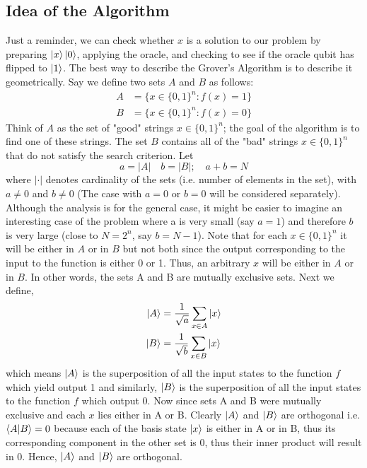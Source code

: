 \subsection{Idea of the Algorithm}
Just a reminder, we can check whether $x$ is a solution to our problem by preparing $\ket{x}\ket{0}$, applying the oracle, and checking to see if the oracle qubit has flipped to $\ket{1}$. The best way to describe the Grover's Algorithm is to describe it geometrically. Say we define two sets $A$ and $B$ as follows:
\begin{align*}
A&=\{x\in\{0,1\}^n: f(x)=1\}\\
B&=\{x\in\{0,1\}^n: f(x)=0\}
\end{align*}
Think of $A$ as the set of "good" strings $x \in \{0,1\}^n$; the goal of the algorithm is to find one of these strings. The set $B$ contains all of the "bad" strings $x\in\{0,1\}^n$ that do not satisfy the search criterion. Let
\[
a=|A| \quad b=|B|; \quad a+b=N
\]
where $|\cdot|$ denotes cardinality of the sets (i.e. number of elements in the set), with $a\neq 0$ and $b\neq 0$ (The case with $a=0$ or $b=0$ will be considered separately). Although the analysis is for the general case, it might be easier to imagine an interesting case of the problem where a is very small (say $a=1$) and therefore $b$ is very large (close to $N=2^n$, say $b=N-1$). Note that for each $x \in \{0,1\}^n$ it will be either in $A$ or in $B$ but not both since the output corresponding to the input to the function is either 0 or 1. Thus, an arbitrary $x$ will be either in $A$ or in $B$. In other words, the sets A and B are mutually exclusive sets.
Next we define, 
\begin{align*}
    \ket{A}&=\frac{1}{\sqrt{a}}\sum_{x\in A} \ket{x}\\
    \ket{B}&=\frac{1}{\sqrt{b}}\sum_{x \in B} \ket{x}
\end{align*}
which means $\ket{A}$ is the superposition of all the input states to the function $f$ which yield output 1 and similarly, $\ket{B}$ is the superposition of all the input states to the function $f$ which output 0. Now since sets A and B were mutually exclusive and each $x$ lies either in A or B. Clearly $\ket{A}$ and $\ket{B}$ are orthogonal i.e. $\braket{A|B}=0$ because each of the basis state $\ket{x}$ is either in A or in B, thus its corresponding component in the other set is 0, thus their inner product will result in 0. Hence, $\ket{A}$ and $\ket{B}$ are orthogonal. 

